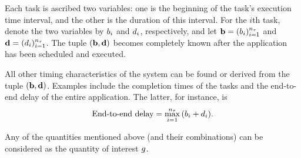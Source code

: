 Each task is ascribed two variables: one is the beginning of the task's
execution time interval, and the other is the duration of this interval. For the
$i$th task, denote the two variables by $b_i$ and $d_i$, respectively, and let
$\mathbf{b} = (b_i)_{i=1}^{{n_\tau}}$ and $\mathbf{d} = (d_i)_{i=1}^{{n_\tau}}$. The tuple $(\mathbf{b},
\mathbf{d})$ becomes completely known after the application has been scheduled and
executed.

All other timing characteristics of the system can be found or derived from the
tuple $(\mathbf{b}, \mathbf{d})$. Examples include the completion times of the tasks and the
end-to-end delay of the entire application. The latter, for instance, is
\begin{equation} \elab{end-to-end-delay}
  \text{End-to-end delay} = \max_{i = 1}^\nt \, (\b_i + \d_i).
\end{equation}

Any of the quantities mentioned above (and their combinations) can be considered
as the quantity of interest $g$.
